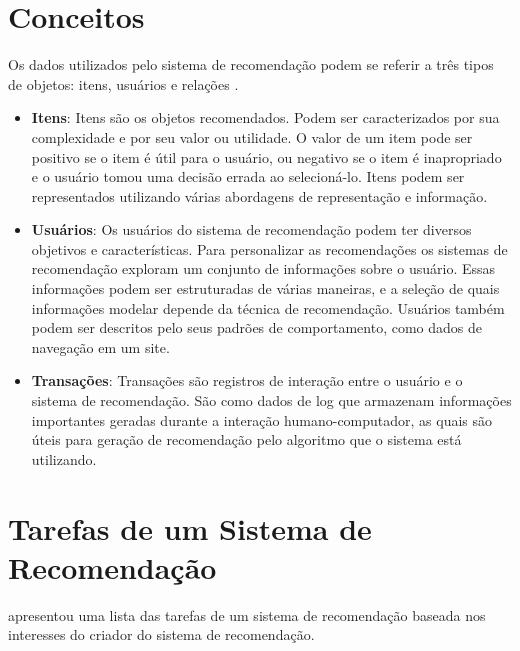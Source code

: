 \section{Conceitos}
\label{sec:conceptsRecSys}

Os dados utilizados pelo sistema de recomendação podem se referir a três tipos de objetos: itens, usuários e relações \citep{Ricci:2010:RSH:1941884}.

\begin{itemize}
	\item{\textbf{Itens}: Itens são os objetos recomendados. Podem ser caracterizados por sua complexidade e por seu valor ou utilidade. O valor de um item pode ser positivo se o item é útil para o usuário, ou negativo se o item é inapropriado e o usuário tomou uma decisão errada ao selecioná-lo. Itens podem ser representados utilizando várias abordagens de representação e informação.}
	
	\item{\textbf{Usuários}: Os usuários do sistema de recomendação podem ter diversos objetivos e características. Para personalizar as recomendações os sistemas de recomendação exploram um conjunto de informações sobre o usuário. Essas informações podem ser estruturadas de várias maneiras, e a seleção de quais informações modelar depende da técnica de recomendação. Usuários também podem ser descritos pelo seus padrões de comportamento, como dados de navegação em um site.}
	
	\item{\textbf{Transações}: Transações são registros de interação entre o usuário e o sistema de recomendação. São como dados de log que armazenam informações importantes geradas durante a interação humano-computador, as quais são úteis para geração de recomendação pelo algoritmo que o sistema está utilizando.}
\end{itemize}

\section{Tarefas de um Sistema de Recomendação}
\label{sec:tasksRecSys}

\cite{Ricci:2010:RSH:1941884} apresentou uma lista das tarefas de um sistema de recomendação baseada nos interesses do criador do sistema de recomendação.

